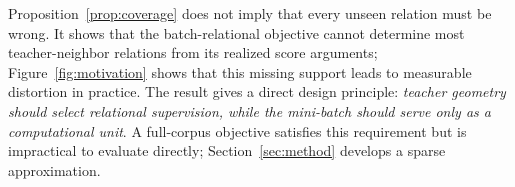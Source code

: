 Proposition~\ref{prop:coverage} does not imply that every unseen relation must be wrong. It shows that the batch-relational objective cannot determine most teacher-neighbor relations from its realized score arguments; Figure~\ref{fig:motivation} shows that this missing support leads to measurable distortion in practice. The result gives a direct design principle: \emph{teacher geometry should select relational supervision, while the mini-batch should serve only as a computational unit}. A full-corpus objective satisfies this requirement but is impractical to evaluate directly; Section~\ref{sec:method} develops a sparse approximation.
